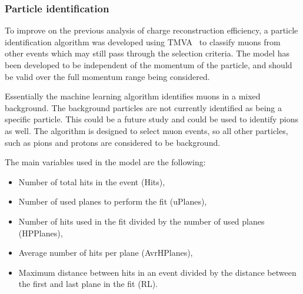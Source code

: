 






\clearpage
\subsubsection{Particle identification}
To improve on the previous analysis of charge reconstruction efficiency, a particle identification algorithm was developed using TMVA~\cite{TMVA} to classify muons from other events which may still pass through the selection criteria. The model has been developed to be independent of the momentum of the particle, and should be valid over the full momentum range being considered.

Essentially the machine learning algorithm identifies muons in a mixed background. The background particles are not currently identified as being a specific particle. This could be a future study and could be used to identify pions as well. The algorithm is designed to select muon events, so all other particles, such as pions and protons are considered to be background.


The main variables used in the model are the following:
\begin{itemize}
\item Number of total hits in the event (Hits),
\item Number of used planes to perform the fit (uPlanes),
\item Number of hits used in the fit divided by the number of used planes (HPPlanes),
\item Average number of hits per plane (AvrHPlanes),
\item Maximum distance between hits in an event divided by the distance between the first and last plane in the fit (RL).
\end{itemize}


